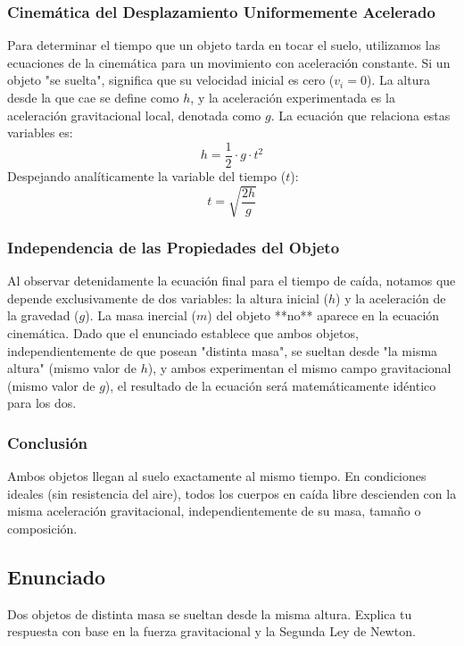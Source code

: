 \documentclass[12pt]{article}
\begin{document}
\subsubsection*{Cinemática del Desplazamiento Uniformemente Acelerado}
Para determinar el tiempo que un objeto tarda en tocar el suelo, utilizamos las ecuaciones de la cinemática para un movimiento con aceleración constante. Si un objeto "se suelta", significa que su velocidad inicial es cero ($v_i = 0$). La altura desde la que cae se define como $h$, y la aceleración experimentada es la aceleración gravitacional local, denotada como $g$.
La ecuación que relaciona estas variables es:
\begin{equation}
    h = \frac{1}{2} \cdot g \cdot t^2
\end{equation}
Despejando analíticamente la variable del tiempo ($t$):
\begin{equation}
    t = \sqrt{\frac{2h}{g}}
\end{equation}

\subsubsection*{Independencia de las Propiedades del Objeto}
Al observar detenidamente la ecuación final para el tiempo de caída, notamos que depende exclusivamente de dos variables: la altura inicial ($h$) y la aceleración de la gravedad ($g$). La masa inercial ($m$) del objeto **no** aparece en la ecuación cinemática. 
Dado que el enunciado establece que ambos objetos, independientemente de que posean "distinta masa", se sueltan desde "la misma altura" (mismo valor de $h$), y ambos experimentan el mismo campo gravitacional (mismo valor de $g$), el resultado de la ecuación será matemáticamente idéntico para los dos.

\subsubsection*{Conclusión}
Ambos objetos llegan al suelo exactamente al mismo tiempo. En condiciones ideales (sin resistencia del aire), todos los cuerpos en caída libre descienden con la misma aceleración gravitacional, independientemente de su masa, tamaño o composición.

\newpage

\subsection*{Enunciado}
Dos objetos de distinta masa se sueltan desde la misma altura. Explica tu respuesta con base en la fuerza gravitacional y la Segunda Ley de Newton.
\end{document}
